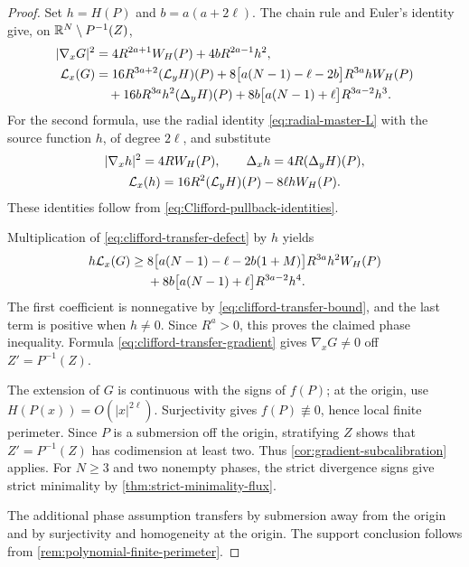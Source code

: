 \begin{proof}
Set \(h=H(P)\) and \(b=a(a+2\ell)\).  The chain rule and Euler's
identity give, on \(\mathbb R^N\setminus P^{-1}(Z)\),
\begin{align}
 |\nabla_xG|^2
 &=4R^{2a+1}W_H(P)+4bR^{2a-1}h^2,
 \label{eq:clifford-transfer-gradient}\\
 \mathcal L_x(G)
 &=16R^{3a+2}(\mathcal L_yH)(P)
   +8\bigl[a(N-1)-\ell-2b\bigr]R^{3a}hW_H(P)\notag\\
 &\quad+16bR^{3a}h^2(\Delta_yH)(P)
   +8b\bigl[a(N-1)+\ell\bigr]R^{3a-2}h^3.
 \label{eq:clifford-transfer-defect}
\end{align}
For the second formula, use the radial identity
\eqref{eq:radial-master-L} with the source function \(h\), of degree
\(2\ell\), and substitute
\[
\begin{gathered}
 |\nabla_xh|^2=4RW_H(P),\qquad
 \Delta_xh=4R(\Delta_yH)(P),\\
 \mathcal L_x(h)=16R^2(\mathcal L_yH)(P)-8\ell hW_H(P).
\end{gathered}
\]
These identities follow from \eqref{eq:Clifford-pullback-identities}.

Multiplication of \eqref{eq:clifford-transfer-defect} by \(h\) yields
\begin{align*}
 h\mathcal L_x(G)\geq{}&
 8\bigl[a(N-1)-\ell-2b(1+M)\bigr]R^{3a}h^2W_H(P)\\
 &+8b\bigl[a(N-1)+\ell\bigr]R^{3a-2}h^4.
\end{align*}
The first coefficient is nonnegative by
\eqref{eq:clifford-transfer-bound}, and the last term is positive
when \(h\ne0\).  Since \(R^a>0\), this proves the claimed phase
inequality.  Formula \eqref{eq:clifford-transfer-gradient} gives
\(\nabla_xG\ne0\) off \(Z'=P^{-1}(Z)\).

The extension of \(G\) is continuous with the signs of \(f(P)\);
at the origin, use \(H(P(x))=O(|x|^{2\ell})\).
Surjectivity gives \(f(P)\not\equiv0\), hence local finite perimeter.
Since \(P\) is a submersion off the origin, stratifying \(Z\) shows
that \(Z'=P^{-1}(Z)\) has codimension at least two. Thus
\cref{cor:gradient-subcalibration} applies. For \(N\ge3\) and two
nonempty phases, the strict divergence signs give strict minimality
by \cref{thm:strict-minimality-flux}.

The additional phase assumption transfers by submersion away from
the origin and by surjectivity and homogeneity at the origin.
The support conclusion follows from \cref{rem:polynomial-finite-perimeter}.
\end{proof}


